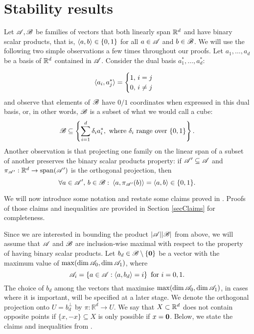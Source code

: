 \section{Stability results}\label{secStability}

Let ${\mathscr{A}}, {\mathscr{B}}$ be families of vectors that both linearly span ${\mathbb{R}}^d$ and have binary scalar products, that is, $\langle a, b \rangle \in \{0,1\}$ for all $a \in {\mathscr{A}}$ and $b \in {\mathscr{B}}$. We will use the following two simple observations a few times throughout our proofs. Let $a_1, \ldots, a_d$ be a basis of ${\mathbb{R}}^d$ contained in ${\mathscr{A}}$. Consider the dual basis $a_1^*, \ldots, a_d^*$:

\[
    \langle a_i, a_j^* \rangle = 
    \begin{cases}
        1,\, i = j \\
        0,\, i\neq j
    \end{cases}
\]
and observe that elements of ${\mathscr{B}}$ have $0/1$ coordinates when expressed in this dual basis, or, in other words, ${\mathscr{B}}$ is a subset of what we would call a cube: 
\[
    {\mathscr{B}} \subseteq \left\{\sum_{i=1}^d \delta_i a_i^*, \text{ where } \delta_i \text{ range over } \{0, 1\}\right\}.
\]
Another observation is that projecting one family on the linear span of a subset of another preserves the binary scalar products property: if ${\mathscr{A}}' \subseteq {\mathscr{A}}$ and $\pi_{{\mathscr{A}}'}: {\mathbb{R}}^d \rightarrow \operatorname{span}({\mathscr{A}}')$ is the orthogonal projection, then
\[
    \forall a \in {\mathscr{A}}',\, b \in {\mathscr{B}}:\: \langle a, \pi_{{\mathscr{A}}'}(b) \rangle = \langle a, b \rangle \in \{0,1\}. 
\]

\noindent We will now introduce some notation and restate some claims proved in \cite{kupavskii22}. Proofs of those claims and inequalities are provided in Section \ref{secClaims} for completeness.

\noindent Since we are interested in bounding the product $|{\mathscr{A}}||{\mathscr{B}}|$ from above, we will assume that ${\mathscr{A}}$ and ${\mathscr{B}}$ are inclusion-wise maximal with respect to the property of having binary scalar products. Let $b_d \in {\mathscr{B}} \setminus \{\mathbf{0}\}$ be a vector with the maximum value of $\operatorname{max}(\operatorname{dim}{\mathscr{A}}_0,\operatorname{dim}{\mathscr{A}}_1)$, where 
\[
    {\mathscr{A}}_i=\left\{a \in {\mathscr{A}}:\left\langle a, b_d\right\rangle=i\right\} \text{ for } i=0, 1.
\]
The choice of $b_d$ among the vectors that maximise $\operatorname{max}(\operatorname{dim}{\mathscr{A}}_0,\operatorname{dim}{\mathscr{A}}_1)$, in cases where it is important, will be specified at a later stage. %
We denote the orthogonal projection onto $U=b_d^\bot$ by $\pi: \mathbb{R}^d \rightarrow U$. We say that $X\subset {\mathbb{R}}^d$ does not contain opposite points if  $\{x,-x\}\subseteq X$ is only possible if $x=\mathbf{0}$. Below, we state the claims and inequalities from \cite{kupavskii22}.

